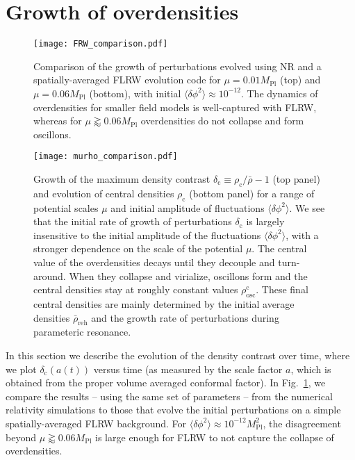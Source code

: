 \documentclass[
    reprint,
    preprintnumbers,
    superscriptaddress,
    nofootinbib,
     amsmath,amssymb,
     aps,
     prd,
    floatfix,
    ]{revtex4-2}
\newcommand{\mpl}{M_\mathrm{Pl}}
\newcommand{\rhoc}{\rho_\mathrm{c}}
\newcommand{\rhocosc}{\rho^\mathrm{c}_\mathrm{osc}}
\newcommand{\rhorehav}{\bar{\rho}_\mathrm{reh}}
\newcommand{\deltac}{\delta_\mathrm{c}}
\begin{document}
\section{Growth of overdensities}
\label{sec:results-growth}

\begin{figure}[t!]
    \centering
    \texttt{[image: FRW\_comparison.pdf]}
\caption{Comparison of the growth of perturbations evolved using NR and a spatially-averaged FLRW evolution code for $\mu=0.01\mpl$ (top) and $\mu=0.06\mpl$ (bottom), with initial $\langle\delta\phi^2\rangle\approx 10^{-12}$. The dynamics of overdensities for smaller field models is well-captured with FLRW, whereas for $\mu\gtrapprox 0.06\mpl$ overdensities do not collapse and form oscillons.}
\label{fig:FRW}
\end{figure}


\begin{figure*}[t!]
    \centering
    \texttt{[image: murho\_comparison.pdf]}
\caption{Growth of the maximum density contrast $\deltac\equiv \rhoc/\bar{\rho} - 1$ (top panel) and evolution of central densities $\rhoc$ (bottom panel) for a range of potential scales $\mu$ and initial amplitude of fluctuations $\langle \delta\phi^2 \rangle$. We see that the initial rate of growth of perturbations $\deltac$ is largely insensitive to the initial amplitude of the fluctuations $\langle\delta\phi^2\rangle$, with a stronger dependence on the scale of the potential $\mu$. The central value of the overdensities decays until they decouple and turn-around. When they collapse and virialize, oscillons form and the central densities stay at roughly constant values $\rhocosc$. These final central densities are mainly determined by the initial average densities $\rhorehav$ and the growth rate of perturbations during parameteric resonance.}
\label{fig:murho_comparison}
\end{figure*}


In this section we describe the evolution of the density contrast over time, where we plot $\deltac\left(a(t)\right)$ versus time (as measured by the scale factor $a$, which is obtained from the proper volume averaged conformal factor). In Fig.~\ref{fig:FRW}, we compare the results  -- using the same set of parameters -- from the numerical relativity simulations to those that evolve the initial perturbations on a simple spatially-averaged FLRW background. 
For $\langle\delta\phi^2\rangle\approx 10^{-12}\mpl^2$, the disagreement beyond $\mu\gtrapprox 0.06\mpl$ is large enough for FLRW to not capture the collapse of overdensities. 
\end{document}
